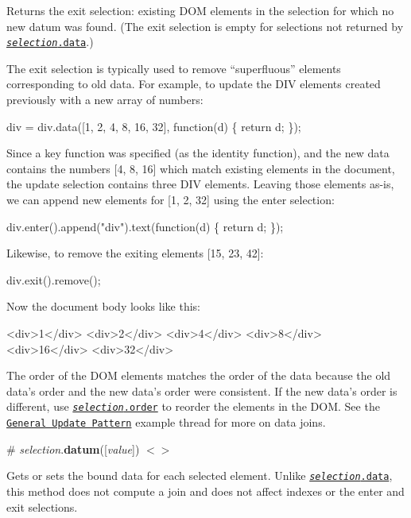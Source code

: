 Returns the exit selection\+: existing D\+OM elements in the selection for which no new datum was found. (The exit selection is empty for selections not returned by \href{#selection_data}{\tt {\itshape selection}.data}.)

The exit selection is typically used to remove “superfluous” elements corresponding to old data. For example, to update the D\+IV elements created previously with a new array of numbers\+:


\begin{DoxyCode}
div = div.data([1, 2, 4, 8, 16, 32], function(d) \{ return d; \});
\end{DoxyCode}


Since a key function was specified (as the identity function), and the new data contains the numbers \mbox{[}4, 8, 16\mbox{]} which match existing elements in the document, the update selection contains three D\+IV elements. Leaving those elements as-\/is, we can append new elements for \mbox{[}1, 2, 32\mbox{]} using the enter selection\+:


\begin{DoxyCode}
div.enter().append("div").text(function(d) \{ return d; \});
\end{DoxyCode}


Likewise, to remove the exiting elements \mbox{[}15, 23, 42\mbox{]}\+:


\begin{DoxyCode}
div.exit().remove();
\end{DoxyCode}


Now the document body looks like this\+:


\begin{DoxyCode}
<div>1</div>
<div>2</div>
<div>4</div>
<div>8</div>
<div>16</div>
<div>32</div>
\end{DoxyCode}


The order of the D\+OM elements matches the order of the data because the old data’s order and the new data’s order were consistent. If the new data’s order is different, use \href{#selection_order}{\tt {\itshape selection}.order} to reorder the elements in the D\+OM. See the \href{http://bl.ocks.org/mbostock/3808218}{\tt General Update Pattern} example thread for more on data joins.

\label{_selection_datum}%
\# {\itshape selection}.{\bfseries datum}(\mbox{[}{\itshape value}\mbox{]}) \href{https://github.com/d3/d3-selection/blob/master/src/selection/datum.js}{\tt $<$$>$}

Gets or sets the bound data for each selected element. Unlike \href{#selection_data}{\tt {\itshape selection}.data}, this method does not compute a join and does not affect indexes or the enter and exit selections.

